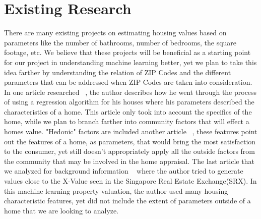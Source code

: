 \section{Existing Research}

There are many existing projects on estimating housing values based on parameters like the number of bathrooms, number of bedrooms, the square footage, etc. We believe that these projects will be beneficial as a starting point for our project in understanding machine learning better, yet we plan to take this idea farther by understanding the relation of ZIP Codes and the different parameters that can be addressed when ZIP Codes are taken into consideration. In one article researched ~\cite{Bershadskiy}, the author describes how he went through the process of using a regression algorithm for his houses where his parameters described the characteristics of a home. This article only took into account the specifics of the home, while we plan to branch farther into community factors that will effect a homes value. "Hedonic" factors are included another article ~\cite{Bergadano2019}, these features point out the features of a home, as parameters, that would bring the most satisfaction to the consumer, yet still doesn't appropriately apply all the outside factors from the community that may be involved in the home appraisal. The last article that we analyzed for background information ~\cite{Christian2019} where the author tried to generate values close to the X-Value seen in the Singapore Real Estate Exchange(SRX). In this machine learning property valuation, the author used many housing characteristic features, yet did not include the extent of parameters outside of a home that we are looking to analyze. 